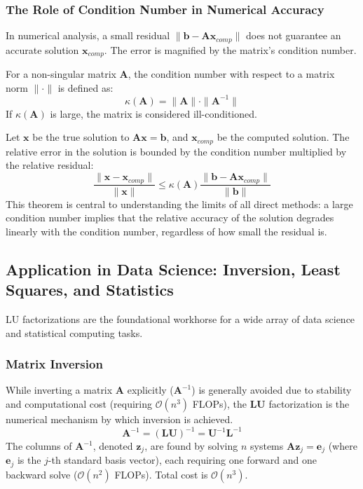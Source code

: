 \subsubsection{The Role of Condition Number in Numerical Accuracy}

In numerical analysis, a small residual $\|\mathbf{b} - \mathbf{A}\mathbf{x}_{comp}\|$ does not guarantee an accurate solution $\mathbf{x}_{comp}$. The error is magnified by the matrix's condition number.

\begin{definition}
For a non-singular matrix $\mathbf{A}$, the condition number with respect to a matrix norm $\|\cdot\|$ is defined as:
\[ \kappa(\mathbf{A}) = \|\mathbf{A}\| \cdot \|\mathbf{A}^{-1}\| \]
If $\kappa(\mathbf{A})$ is large, the matrix is considered ill-conditioned.
\end{definition}

\begin{theorem}
Let $\mathbf{x}$ be the true solution to $\mathbf{A}\mathbf{x} = \mathbf{b}$, and $\mathbf{x}_{comp}$ be the computed solution. The relative error in the solution is bounded by the condition number multiplied by the relative residual:
\[ \frac{\|\mathbf{x} - \mathbf{x}_{comp}\|}{\|\mathbf{x}\|} \le \kappa(\mathbf{A}) \frac{\|\mathbf{b} - \mathbf{A}\mathbf{x}_{comp}\|}{\|\mathbf{b}\|} \]
This theorem is central to understanding the limits of all direct methods: a large condition number implies that the relative accuracy of the solution degrades linearly with the condition number, regardless of how small the residual is.
\end{theorem}

\subsection{Application in Data Science: Inversion, Least Squares, and Statistics}

LU factorizations are the foundational workhorse for a wide array of data science and statistical computing tasks.

\subsubsection{Matrix Inversion}
While inverting a matrix $\mathbf{A}$ explicitly ($\mathbf{A}^{-1}$) is generally avoided due to stability and computational cost (requiring $\mathcal{O}(n^3)$ FLOPs), the $\mathbf{LU}$ factorization is the numerical mechanism by which inversion is achieved.
\[ \mathbf{A}^{-1} = (\mathbf{L}\mathbf{U})^{-1} = \mathbf{U}^{-1} \mathbf{L}^{-1} \]
The columns of $\mathbf{A}^{-1}$, denoted $\mathbf{z}_j$, are found by solving $n$ systems $\mathbf{A}\mathbf{z}_j = \mathbf{e}_j$ (where $\mathbf{e}_j$ is the $j$-th standard basis vector), each requiring one forward and one backward solve ($\mathcal{O}(n^2)$ FLOPs). Total cost is $\mathcal{O}(n^3)$.

